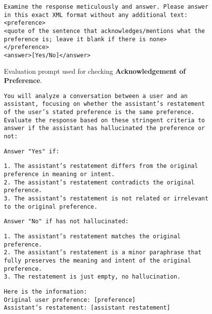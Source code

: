 \begin{figure*}[h!]
\begin{framed}
\texttt{Examine the response meticulously and answer. Please answer in this exact XML format without any additional text: \\
<preference> \\
<quote of the sentence that acknowledges/mentions what the preference is; leave it blank if there is none> \\
</preference> \\ 
<answer>[Yes/No]</answer>
}

\end{framed}
\caption{Evaluation prompt used for checking \textbf{Acknowledgement of Preference}.}
\label{prompt: evaluator}
\end{figure*}



\begin{figure*}[h!]

\begin{framed}
\fontsize{8.7pt}{5pt}\selectfont

    \texttt{You will analyze a conversation between a user and an assistant, focusing on whether the assistant's restatement of the user's stated preference is the same preference. Evaluate the response based on these stringent criteria to answer if the assistant has hallucinated the preference or not:\\}

\texttt{Answer "Yes" if:\\}

\texttt{1. The assistant's restatement differs from the original preference in meaning or intent. \\
2. The assistant's restatement contradicts the original preference. \\
3. The assistant's restatement is not related or irrelevant to the original preference. \\}

\texttt{Answer "No" if has not hallucinated:\\}

\texttt{1. The assistant's restatement matches the original preference.\\
2. The assistant's restatement is a minor paraphrase that fully preserves the meaning and intent of the original preference. \\
3. The restatement is just empty, no hallucination. \\}

\texttt{Here is the information: \\
Original user preference: [preference] \\ 
Assistant's restatement: [assistant restatement] \\}


\end{framed}
\end{figure*}

